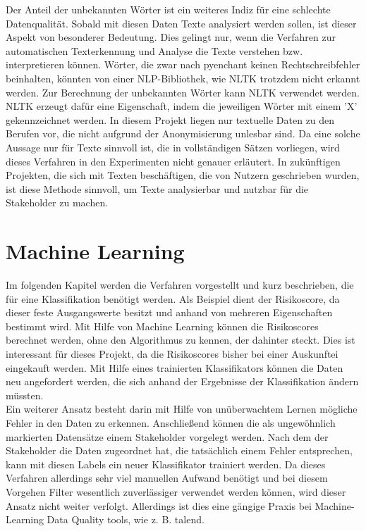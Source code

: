 Der Anteil der unbekannten Wörter ist ein weiteres Indiz für eine schlechte Datenqualität. \cite{kiefer2019}
Sobald mit diesen Daten Texte analysiert werden sollen, ist dieser Aspekt von besonderer Bedeutung.    Dies gelingt nur, wenn die Verfahren zur automatischen Texterkennung und Analyse die Texte verstehen bzw. interpretieren können. 
Wörter, die zwar nach pyenchant keinen Rechtschreibfehler beinhalten, könnten von einer NLP-Bibliothek, wie NLTK trotzdem nicht erkannt werden. 
Zur Berechnung der unbekannten Wörter kann NLTK verwendet werden. \cite{kiefer2019}
NLTK erzeugt dafür eine Eigenschaft, indem die jeweiligen Wörter mit einem 'X' gekennzeichnet werden. \cite{kiefer2019}
In diesem Projekt liegen nur textuelle Daten zu den Berufen vor, die nicht aufgrund der Anonymisierung unlesbar sind. 
Da eine solche Aussage nur für Texte sinnvoll ist, die in vollständigen Sätzen vorliegen, wird dieses Verfahren in den Experimenten nicht genauer erläutert. 
In zukünftigen Projekten, die sich mit Texten beschäftigen, die von Nutzern geschrieben wurden, ist diese Methode sinnvoll, um Texte analysierbar und nutzbar für die Stakeholder zu machen. 







\section{Machine Learning}
Im folgenden Kapitel werden die Verfahren vorgestellt und kurz beschrieben, die für eine Klassifikation benötigt werden. 
Als Beispiel dient der Risikoscore, da dieser feste Ausgangswerte besitzt und anhand von mehreren Eigenschaften bestimmt wird. 
Mit Hilfe von Machine Learning können die Risikoscores berechnet werden, ohne den Algorithmus zu kennen, der dahinter steckt. 
Dies ist interessant für dieses Projekt, da die Risikoscores bisher bei einer Auskunftei eingekauft werden.
Mit Hilfe eines trainierten Klassifikators können die Daten neu angefordert werden, die sich anhand der Ergebnisse der Klassifikation ändern müssten. 
\\
Ein weiterer Ansatz besteht darin mit Hilfe von unüberwachtem Lernen mögliche Fehler in den Daten zu erkennen.
Anschließend können die als ungewöhnlich markierten Datensätze einem Stakeholder vorgelegt werden.
Nach dem der Stakeholder die Daten zugeordnet hat, die tatsächlich einem Fehler entsprechen, kann mit diesen Labels ein neuer Klassifikator trainiert werden. 
Da dieses Verfahren allerdings sehr viel manuellen Aufwand benötigt und bei diesem Vorgehen Filter wesentlich zuverlässiger verwendet werden können, wird dieser Ansatz nicht weiter verfolgt.
Allerdings ist dies eine gängige Praxis bei Machine-Learning Data Quality tools, wie z. B. talend. 


